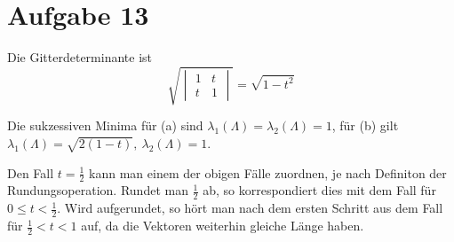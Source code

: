\section*{Aufgabe 13}
Die Gitterdeterminante ist
\[ \sqrt{\begin{vmatrix}1&t\\t&1\end{vmatrix}} = \sqrt{1-t^2} \]

\begin{table}[!ht]
\end{table}

\noindent Die sukzessiven Minima für (a) sind $\lambda_1(\Lambda) = \lambda_2(\Lambda) =
1$, für (b) gilt $\lambda_1(\Lambda) = \sqrt{2(1-t)}, \ \lambda_2(\Lambda) = 1$.

Den Fall $t=\frac{1}{2}$ kann man einem der obigen Fälle zuordnen, je nach
Definiton der Rundungsoperation. Rundet man $\frac{1}{2}$ ab, so korrespondiert
dies mit dem Fall für $0 \leq t < \frac{1}{2}$. Wird aufgerundet, so hört man
nach dem ersten Schritt aus dem Fall für $\frac{1}{2} < t < 1$ auf, da die
Vektoren weiterhin gleiche Länge haben.

